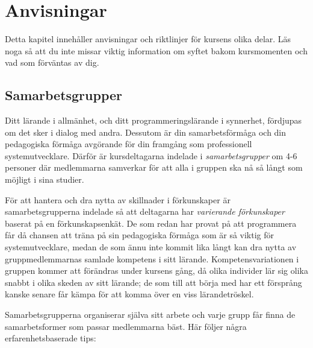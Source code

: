 
\chapter{Anvisningar}

Detta kapitel innehåller anvisningar och riktlinjer för kursens olika delar. Läs noga så att du inte missar viktig information om syftet bakom kursmomenten och vad som förväntas av dig.

\section{Samarbetsgrupper}

Ditt lärande i allmänhet, och ditt programmeringslärande i synnerhet, fördjupas om det sker i dialog med andra. Dessutom är din samarbetsförmåga och din pedagogiska förmåga avgörande för din framgång som professionell systemutvecklare. Därför är kursdeltagarna indelade i \emph{samarbetsgrupper} om 4-6 personer där medlemmarna samverkar för att alla i gruppen ska nå så långt som möjligt i sina studier.

För att hantera och dra nytta av skillnader i förkunskaper är samarbetsgrupperna indelade så att deltagarna har \emph{varierande förkunskaper} baserat på en förkunskapsenkät. De som redan har provat på att programmera får då chansen att träna på sin pedagogiska förmåga som är så viktig för systemutvecklare, medan de som ännu inte kommit lika långt kan dra nytta av gruppmedlemmarnas samlade kompetens i sitt lärande. Kompetensvariationen i gruppen kommer att förändras under kursens gång, då olika individer lär sig olika snabbt i olika skeden av sitt lärande; de som till att börja med har ett försprång kanske senare får kämpa för att komma över en viss lärandetröskel.

Samarbetsgrupperna organiserar själva sitt arbete och varje grupp får finna de samarbetsformer som passar medlemmarna bäst. Här följer några erfarenhetsbaserade tips:

